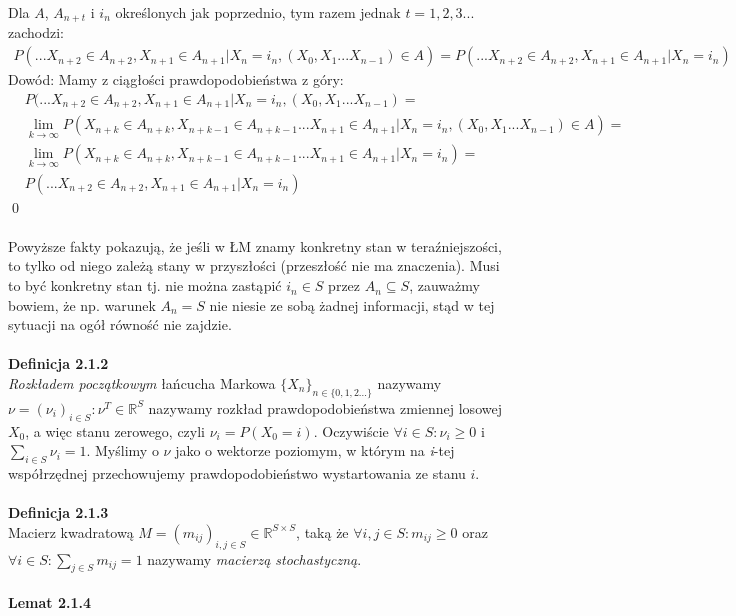 \documentclass[a4paper]{article}
\begin{document}
Dla $A$, $A_{n+t}$ i $i_n$ określonych jak poprzednio, tym razem jednak $t = 1,2,3...$ zachodzi:
\begin{align*}
P(...X_{n+2} \in A_{n+2}, X_{n+1} \in A_{n+1}|X_n = i_n, (X_{0}, X_{1} ... X_{n-1}) \in A) = P(...X_{n+2} \in A_{n+2}, X_{n+1} \in A_{n+1}|X_n = i_n)
\end{align*}
Dowód: Mamy z ciągłości prawdopodobieństwa z góry:
\begin{align*}
&P(...X_{n+2} \in A_{n+2}, X_{n+1} \in A_{n+1}|X_n = i_n, (X_{0}, X_{1} ... X_{n-1}) =\\ &\lim_{k \to \infty} P(X_{n+k} \in A_{n+k}, X_{n+k-1} \in A_{n+k-1}...X_{n+1} \in A_{n+1}|X_n = i_n, (X_{0}, X_{1} ... X_{n-1}) \in A) = \\
&\lim_{k \to \infty} P(X_{n+k} \in A_{n+k}, X_{n+k-1} \in A_{n+k-1}...X_{n+1} \in A_{n+1}|X_n = i_n) = \\
&P(...X_{n+2} \in A_{n+2}, X_{n+1} \in A_{n+1}|X_n = i_n)
\end{align*}
\qed
\\\\
Powyższe fakty pokazują, że jeśli w ŁM znamy konkretny stan w teraźniejszości, to tylko od niego zależą stany w przyszłości (przeszłość nie ma znaczenia). Musi to być konkretny stan tj. nie można zastąpić $i_n \in S$ przez $A_n \subseteq S$, zauważmy bowiem, że np. warunek $A_n = S$ nie niesie ze sobą żadnej informacji, stąd w tej sytuacji na ogół równość nie zajdzie.
\\\\
\textbf{Definicja 2.1.2}\\
\textit{Rozkładem początkowym}  łańcucha Markowa $\{X_n\}_{n \in \{0,1,2...\}}$ nazywamy $\nu = (\nu_i)_{i \in S}: \nu^T \in \mathbb{R}^S$ nazywamy rozkład prawdopodobieństwa zmiennej losowej $X_0$, a więc stanu zerowego, czyli $\nu_i = P(X_0 = i)$. Oczywiście $\forall i \in S: \nu_i \geq 0$ i $\sum\limits_{i \in S}\nu_i = 1$. Myślimy o $\nu$ jako o wektorze poziomym, w którym na \textit{i}-tej współrzędnej przechowujemy prawdopodobieństwo wystartowania ze stanu $i$.
\\\\\textbf{Definicja 2.1.3}\\
Macierz kwadratową $M = (m_{ij})_{i,j \in S} \in \mathbb{R}^{S \times S}$, taką że $\forall i, j \in S: m_{ij} \geq 0$ oraz $\forall i \in S: \sum\limits_{j \in S} m_{ij} = 1$ nazywamy \textit{macierzą stochastyczną}.
\\\\
\textbf{Lemat 2.1.4}\\
\end{document}
